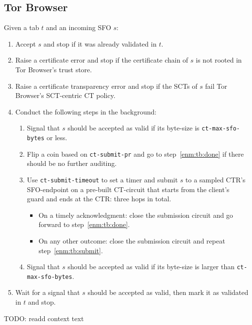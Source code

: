 \subsection{Tor Browser} \label{sec:design:tb}
Given a tab $t$ and an incoming SFO $s$:
\begin{enumerate}
	\item Accept $s$ and stop if it was already validated in $t$.
	\item Raise a certificate error and stop if the certificate chain of $s$
		is not rooted in Tor Browser's trust store.
	\item Raise a certificate transparency error and stop if the SCTs of $s$
		fail Tor Browser's SCT-centric CT policy.
	\item Conduct the following steps in the background:
		\begin{enumerate}
			\item Signal that $s$ should be accepted as valid if its byte-size
				is \texttt{ct-max-sfo-bytes} or less.
			\item Flip a coin based on \texttt{ct-submit-pr} and go to
				step~\ref{enm:tb:done} if there should be no further auditing.
			\item\label{enm:tb:submit} Use \texttt{ct-submit-timeout} to set a
				timer and submit $s$ to a sampled CTR's SFO-endpoint on a
				pre-built CT-circuit that starts from the client's guard and
				ends at the CTR: three hops in total.
				\begin{itemize}
					\item On a timely acknowledgment: close the submission
						circuit and go forward to step~\ref{enm:tb:done}.
					\item On any other outcome: close the submission circuit and
						repeat step~\ref{enm:tb:submit}.
				\end{itemize}
			\item\label{enm:tb:done} Signal that $s$ should be accepted as valid
				if its byte-size is larger than \texttt{ct-max-sfo-bytes}.
		\end{enumerate}
	\item Wait for a signal that $s$ should be accepted as valid, then mark it
		as validated in $t$ and stop.
\end{enumerate}

TODO: readd context text

